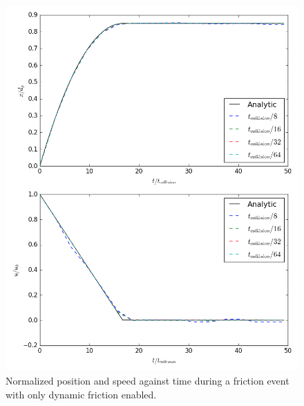 \documentclass[10pt,a4paper,titlepage]{report}
\begin{document}
\begin{figure}[!htb]
\centering
\includegraphics[scale=0.5]{figures/opencl_verification/friction_verification_dynamic_only.png}
\caption{Normalized position and speed against time during a friction event with only dynamic friction enabled.}
\label{fig:opencl_friction_verification_dynamic_only}
\end{figure}
\end{document}
